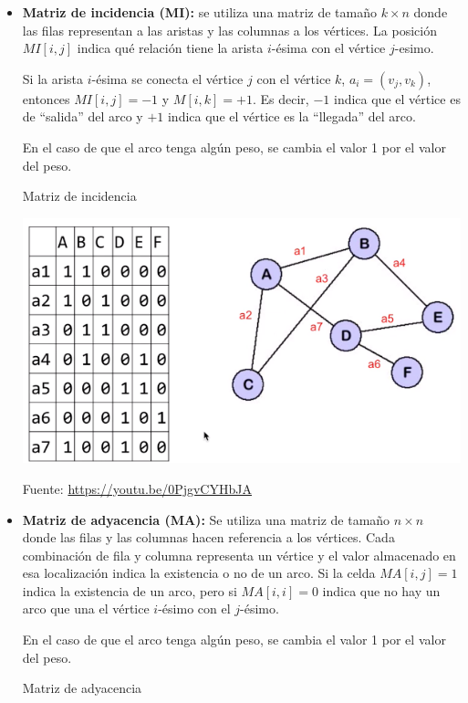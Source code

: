 \begin{itemize}
\item \textbf{Matriz de incidencia (MI):} se utiliza una matriz de tamaño $k\times n$ donde las filas representan a las aristas y las columnas a los vértices. La posición $MI[i, j]$ indica qué relación tiene la arista $i$-ésima con el vértice $j$-esimo. 

Si la arista $i$-ésima se conecta el vértice $j$ con el vértice $k$, $a_i=(v_j,v_k)$, entonces $MI[i,j]=-1$ y $M[i,k]=+1$. Es decir, $-1$ indica que el vértice es de ``salida'' del arco y $+1$ indica que el vértice es la ``llegada'' del arco.

En el caso de que el arco tenga algún peso, se cambia el valor 1 por el valor del peso.

\begin{ejemplo}
Matriz de incidencia

\centerline{\includegraphics[width=.5\textwidth]{input/06-Graph-fig/MatrizIncidencia}}

Fuente: \url{https://youtu.be/0PjgvCYHbJA}
\end{ejemplo}


\item \textbf{Matriz de adyacencia (MA):} Se utiliza una matriz de tamaño  $n\times n$ donde las filas y las columnas hacen referencia a los vértices. Cada combinación de fila y columna representa un vértice y el valor almacenado en esa localización indica la existencia o no de un arco.
Si la celda $MA[i, j]=1$ indica la existencia de un arco, pero si $MA[i, i] = 0$ indica que no hay un arco que una el vértice $i$-ésimo con el $j$-ésimo.

En el caso de que el arco tenga algún peso, se cambia el valor 1 por el valor del peso.





\begin{ejemplo}
Matriz de adyacencia


\end{ejemplo}
\end{itemize}
